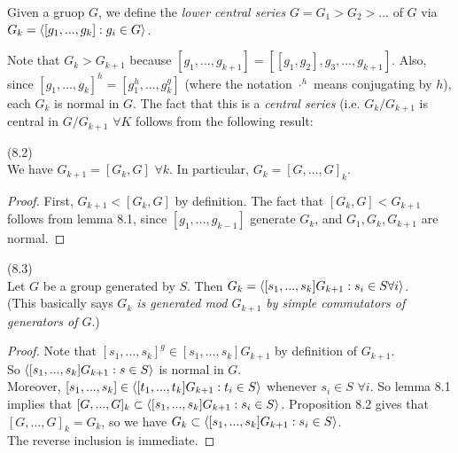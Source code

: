 \documentclass[a4paper]{article}
\begin{document}
\begin{defi}
Given a gruop $G$, we define the \emph{lower central series} $G=G_1 >G_2>...$ of $G$ via $G_k = \langle [g_1,...,g_k]: g_i \in G\rangle$.
\end{defi}

Note that $G_k > G_{k+1}$ because $[g_1,...,g_{k+1}] = [[g_1,g_2],g_3,...,g_{k+1}]$. Also, since $[g_1,...,g_k]^h = [g_1^h,...,g_k^g]$ (where the notation $\cdot^h$ means conjugating by $h$), each $G_k$ is normal in $G$. The fact that this is a \emph{central series} (i.e. $G_k/G_{k+1}$ is central in $G/G_{k+1}$ $\forall K$ follows from the following result:

\begin{prop} (8.2)\\
We have $G_{k+1} = [G_k,G]$ $\forall k$. In particular, $G_k = [G,...,G]_k$.
\begin{proof}
First, $G_{k+1} < [G_k,G]$ by definition. The fact that $[G_k,G] < G_{k+1}$ follows from lemma 8.1, since $[g_1,...,g_{k-1}]$ generate $G_k$, and $G_1,G_k,G_{k+1}$ are normal.
\end{proof}
\end{prop}

\begin{prop} (8.3)\\
Let $G$ be a group generated by $S$. Then $G_k = \langle [s_1,...,s_k] G_{k+1}: s_i \in S \forall i \rangle$.\\
(This basically says \emph{$G_k$ is generated mod $G_{k+1}$ by simple commutators of generators of $G$}.)
\begin{proof}
Note that $[s_1,...,s_k]^g \in [s_1,...,s_k]G_{k+1}$ by definition of $G_{k+1}$.\\
So $\langle [s_1,...,s_k] G_{k+1} : s \in S\rangle$ is normal in $G$.\\
Moreover, $[s_1,...,s_k] \in \langle [t_1,...,t_k]G_{k+1}: t_i \in S\rangle$ whenever $s_i \in S$ $\forall i$. So lemma 8.1 implies that $[G,...,G]_k \subset \langle[s_1,...,s_k] G_{k+1}: s_i \in S \rangle$. Proposition 8.2 gives that $[G,...,G]_k = G_k$, so we have $G_k \subset \langle [s_1,...,s_k] G_{k+1} : s_i \in S \rangle$.\\
The reverse inclusion is immediate.
\end{proof}
\end{prop}
\end{document}

